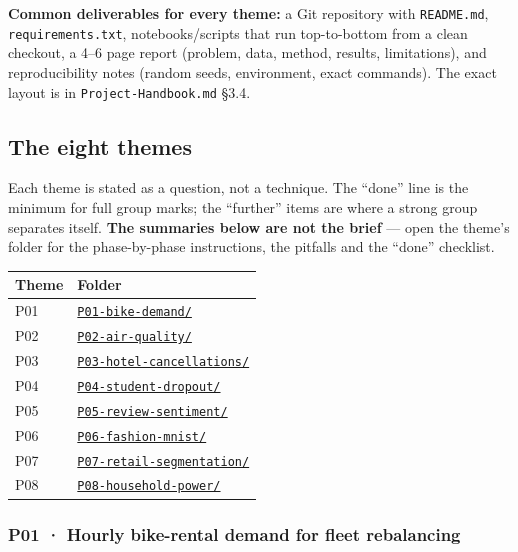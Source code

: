 \documentclass[11pt]{article}
\begin{document}
\textbf{Common deliverables for every theme:} a Git repository with \texttt{README.md}, \texttt{requirements.txt}, notebooks/scripts that run top-to-bottom from a clean checkout, a 4--6 page report (problem, data, method, results, limitations), and reproducibility notes (random seeds, environment, exact commands). The exact layout is in \texttt{Project-Handbook.md} §3.4.



\hypertarget{the-eight-themes}{%
\subsection{The eight themes}\label{the-eight-themes}}

Each theme is stated as a question, not a technique. The ``done'' line is the minimum for full group marks; the ``further'' items are where a strong group separates itself. \textbf{The summaries below are not the brief} --- open the theme's folder for the phase-by-phase instructions, the pitfalls and the ``done'' checklist.

{\footnotesize
\begin{longtable}[]{@{}ll@{}}
\toprule
Theme & Folder\tabularnewline
\midrule
\endhead
P01 & \href{P01-bike-demand/README.md}{\texttt{P01-bike-demand/}}\tabularnewline
P02 & \href{P02-air-quality/README.md}{\texttt{P02-air-quality/}}\tabularnewline
P03 & \href{P03-hotel-cancellations/README.md}{\texttt{P03-hotel-cancellations/}}\tabularnewline
P04 & \href{P04-student-dropout/README.md}{\texttt{P04-student-dropout/}}\tabularnewline
P05 & \href{P05-review-sentiment/README.md}{\texttt{P05-review-sentiment/}}\tabularnewline
P06 & \href{P06-fashion-mnist/README.md}{\texttt{P06-fashion-mnist/}}\tabularnewline
P07 & \href{P07-retail-segmentation/README.md}{\texttt{P07-retail-segmentation/}}\tabularnewline
P08 & \href{P08-household-power/README.md}{\texttt{P08-household-power/}}\tabularnewline
\bottomrule
\end{longtable}
}

\hypertarget{p01-hourly-bike-rental-demand-for-fleet-rebalancing}{%
\subsubsection{P01 · Hourly bike-rental demand for fleet rebalancing}\label{p01-hourly-bike-rental-demand-for-fleet-rebalancing}}
\end{document}
